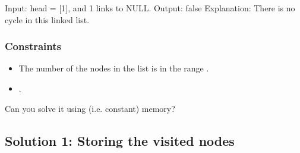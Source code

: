 \documentclass[letterpaper,12pt,english]{book}
\begin{document}
\begin{sphinxVerbatim}[commandchars=\\\{\}]
Input: head = [1], and 1 links to NULL.
Output: false
Explanation: There is no cycle in this linked list.
\end{sphinxVerbatim}


\subsubsection{Constraints}
\label{\detokenize{Two_Pointers/08_TP_141_Linked_List_Cycle:constraints}}\begin{itemize}
\item {} 
\sphinxAtStartPar
The number of the nodes in the list is in the range \sphinxcode{\sphinxupquote{{[}0, 10\textasciicircum{}4{]}}}.

\item {} 
\sphinxAtStartPar
{}.

\end{itemize}

\sphinxAtStartPar
{} Can you solve it using  (i.e. constant) memory?


\subsection{Solution 1: Storing the visited nodes}
\label{\detokenize{Two_Pointers/08_TP_141_Linked_List_Cycle:solution-1-storing-the-visited-nodes}}
\end{document}
